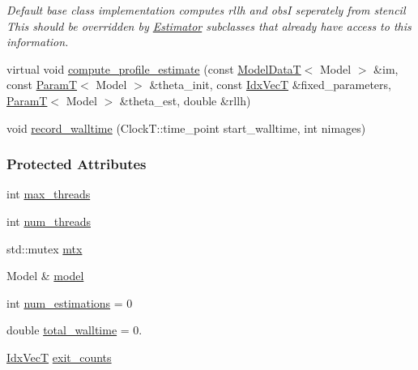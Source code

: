 \begin{DoxyCompactItemize}
\begin{DoxyCompactList}\small\item\em Default base class implementation computes rllh and obsI seperately from stencil This should be overridden by \hyperlink{classmappel_1_1Estimator}{Estimator} subclasses that already have access to this information. \end{DoxyCompactList}\item 
virtual void \hyperlink{classmappel_1_1Estimator_a273f65624e06688cd4b1126e3e7556ae}{compute\+\_\+profile\+\_\+estimate} (const \hyperlink{namespacemappel_a97f050df953605381ae9c901c3b125f1}{Model\+DataT}$<$ Model $>$ \&im, const \hyperlink{namespacemappel_a667925cb0d6c0e49f2f035cc5a9a6857}{ParamT}$<$ Model $>$ \&theta\+\_\+init, const \hyperlink{namespacemappel_ac63743dcd42180127307cd0e4ecdd784}{Idx\+VecT} \&fixed\+\_\+parameters, \hyperlink{namespacemappel_a667925cb0d6c0e49f2f035cc5a9a6857}{ParamT}$<$ Model $>$ \&theta\+\_\+est, double \&rllh)
\item 
void \hyperlink{classmappel_1_1Estimator_a50125572d3b87ebcf1ffb27a8d8c643d}{record\+\_\+walltime} (Clock\+T\+::time\+\_\+point start\+\_\+walltime, int nimages)
\end{DoxyCompactItemize}
\subsubsection*{Protected Attributes}
\begin{DoxyCompactItemize}
\item 
int \hyperlink{classmappel_1_1ThreadedEstimator_a31391f8aaab3484f58bfdedbdb22be42}{max\+\_\+threads}
\item 
int \hyperlink{classmappel_1_1ThreadedEstimator_a6afa05d7d971f3317ce1602de853123b}{num\+\_\+threads}
\item 
std\+::mutex \hyperlink{classmappel_1_1ThreadedEstimator_a4538fd0860243430bfd47e8064c8cfe4}{mtx}
\item 
Model \& \hyperlink{classmappel_1_1Estimator_a8322546d87ccdf01f8b0dcd9dae509f0}{model}
\item 
int \hyperlink{classmappel_1_1Estimator_ab15b88435d6c50a68fac84465d950b12}{num\+\_\+estimations} = 0
\item 
double \hyperlink{classmappel_1_1Estimator_a5a408458a111c5222193871fa6bb6644}{total\+\_\+walltime} = 0.
\item 
\hyperlink{namespacemappel_ac63743dcd42180127307cd0e4ecdd784}{Idx\+VecT} \hyperlink{classmappel_1_1Estimator_a490b648fdbd7ddae7ce41fbf26e29b48}{exit\+\_\+counts}
\end{DoxyCompactItemize}


